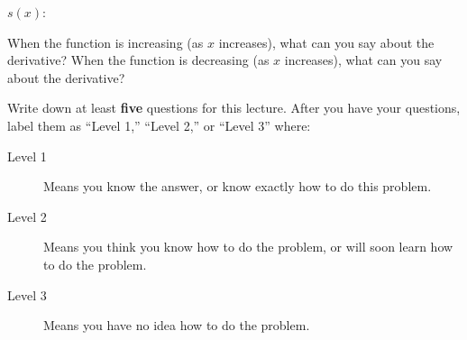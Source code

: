 \documentclass{ximera}
\begin{document}
\begin{question}
$s(x)$:
\begin{image} 
\end{image}

\begin{hint}
When the function is increasing (as $x$ increases), what can you say
about the derivative? When the function is decreasing (as $x$
increases), what can you say about the derivative?
\end{hint}
\begin{multipleChoice}
\end{multipleChoice}
\end{question}




\begin{question}
Write down at least \textbf{five} questions for this lecture. After
you have your questions, label them as ``Level 1,'' ``Level 2,'' or ``Level 3'' where:
\begin{description}
\item[Level 1] Means you know the answer, or know exactly how to do this problem.
\item[Level 2] Means you think you know how to do the problem, or will soon learn how to do the problem.
\item[Level 3] Means you have no idea how to do the problem. 
\end{description}
  \begin{freeResponse}
  \end{freeResponse}
\end{question}
\end{document}
